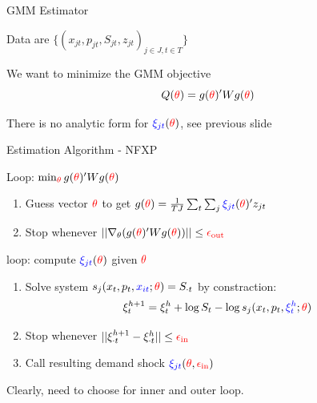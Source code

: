 \documentclass[english]{beamer}
\begin{document}
\begin{frame}{GMM Estimator}
\begin{widei}
\item Data are $\{(x_{jt},p_{jt},S_{jt},z_{jt})_{j\in J,t\in T}\}$
\item We want to minimize the GMM objective
\begin{equation*}
Q({\color{red}{\theta}}) = g({\color{red}{\theta}})' W g({\color{red}{\theta}})
\end{equation*}
\item There is no analytic form for ${\color{blue}{\xi_{jt}}}({\color{red}{\theta}})$, see previous slide
\end{widei}
\end{frame}

\begin{frame}{\cite{BLP} Estimation Algorithm - NFXP}
\begin{midi}
\item {} Loop: $\min_{{\color{red}{\theta}}} g({\color{red}{\theta}})' W g({\color{red}{\theta}})$
\begin{enumerate}
\item Guess vector ${\color{red}{\theta}}$ to get $g({\color{red}{\theta}}) = \frac{1}{TJ}\sum_t \sum_j{\color{blue}{\xi_{jt}}}({\color{red}{\theta}})' z_{jt}$
\item Stop whenever $|| \nabla_\theta(g({\color{red}{\theta}})' W g({\color{red}{\theta}})) || \leq {\color{red}{\epsilon_\text{out}}}$
\end{enumerate}
\pause
\item {} loop: compute ${\color{blue}{\xi_{jt}}}({\color{red}{\theta}})$ given ${\color{red}{\theta}}$
\begin{enumerate}
\item Solve system $s_j(x_t,p_t,{\color{blue}{x_{it}}};{\color{red}{\theta}}) = S_{\cdot t}$ by  constraction:
\begin{equation*}
\xi_t^{h+1} = \xi_t^{h} + \log S_t - \log s_j(x_t,p_t,{\color{blue}{\xi_{t}^h}};{\color{red}{\theta}})
\end{equation*}
\item Stop whenever $|| \xi_{\cdot t}^{h+1} - \xi_{\cdot t}^{h}  || \leq {\color{red}{\epsilon_\text{in}}}$
\item Call resulting demand shock ${\color{blue}{\xi_{jt}}}({\color{red}{\theta}},{\color{red}{\epsilon_\text{in}}})$
\end{enumerate}
\item Clearly, need to choose  for inner and outer loop.
\end{midi}
\end{frame}
\end{document}

